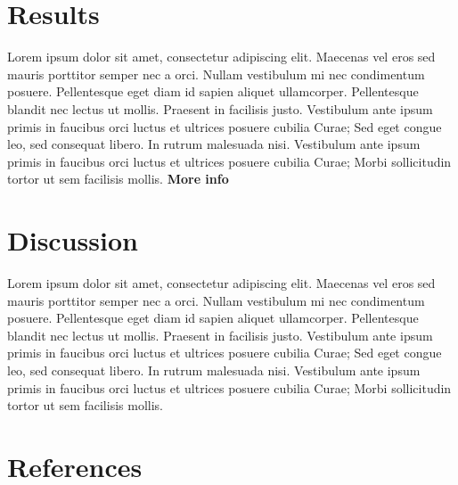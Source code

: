 \documentclass[11pt]{umnthesis}
\begin{document}
\hypertarget{results}{%
\chapter{Results}\label{results}}

Lorem ipsum dolor sit amet, consectetur adipiscing elit. Maecenas vel eros sed mauris porttitor semper nec a orci. Nullam vestibulum mi nec condimentum posuere. Pellentesque eget diam id sapien aliquet ullamcorper. Pellentesque blandit nec lectus ut mollis. Praesent in facilisis justo. Vestibulum ante ipsum primis in faucibus orci luctus et ultrices posuere cubilia Curae; Sed eget congue leo, sed consequat libero. In rutrum malesuada nisi. Vestibulum ante ipsum primis in faucibus orci luctus et ultrices posuere cubilia Curae; Morbi sollicitudin tortor ut sem facilisis mollis.
\textbf{More info}

\hypertarget{discussion}{%
\chapter{Discussion}\label{discussion}}

Lorem ipsum dolor sit amet, consectetur adipiscing elit. Maecenas vel eros sed mauris porttitor semper nec a orci. Nullam vestibulum mi nec condimentum posuere. Pellentesque eget diam id sapien aliquet ullamcorper. Pellentesque blandit nec lectus ut mollis. Praesent in facilisis justo. Vestibulum ante ipsum primis in faucibus orci luctus et ultrices posuere cubilia Curae; Sed eget congue leo, sed consequat libero. In rutrum malesuada nisi. Vestibulum ante ipsum primis in faucibus orci luctus et ultrices posuere cubilia Curae; Morbi sollicitudin tortor ut sem facilisis mollis.

\hypertarget{references-1}{%
\chapter*{References}\label{references-1}}

\noindent

\setlength{\parindent}{-0.20in}
\setlength{\leftskip}{0.20in}
\setlength{\parskip}{8pt}
\end{document}
